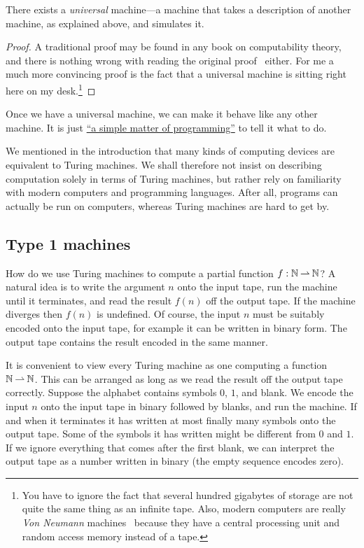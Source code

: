 \begin{theorem}[Turing]
  \label{thm:universal-machine}
  There exists a \emph{universal} machine---a machine that takes a
  description of another machine, as explained above, and simulates
  it.
\end{theorem}

\begin{proof}
  A traditional proof may be found in any book on computability
  theory, and there is nothing wrong with reading the original
  proof~\cite{turing37:_comput_number_with_applic_to_entsc} either.
  For me a much more convincing proof is the fact that a universal
  machine is sitting right here on my desk.\footnote{You have to
    ignore the fact that several hundred gigabytes of storage are not
    quite the same thing as an infinite tape. Also, modern computers
    are really \emph{Von Neumann}
    machines~\cite{goldstein47:_repor_mathem_and_logic_aspec} because
    they have a central processing unit and random access memory
    instead of a tape.}
\end{proof}

Once we have a universal machine, we can make it behave like any other
machine. It is just
\href{http://www.catb.org/jargon/html/S/SMOP.html}{``a simple matter
  of programming''} to tell it what to do.

We mentioned in the introduction that many kinds of computing devices
are equivalent to Turing machines. We shall therefore not insist on
describing computation solely in terms of Turing machines, but rather
rely on familiarity with modern computers and programming languages.
After all, programs can actually be run on computers, whereas Turing
machines are hard to get by.


\subsection{Type 1 machines}
\label{sec:type-1}

How do we use Turing machines to compute a partial function $f :
\mathbb{N} \mathbin{\rightharpoonup} \mathbb{N}$? A natural idea is to write the argument $n$ onto the
input tape, run the machine until it terminates, and read the result
$f(n)$ off the output tape. If the machine diverges then $f(n)$ is
undefined. Of course, the input $n$ must be suitably encoded onto the
input tape, for example it can be written in binary form. The output
tape contains the result encoded in the same manner.

It is convenient to view every Turing machine as one computing a
function $\mathbb{N} \mathbin{\rightharpoonup} \mathbb{N}$. This can be arranged as long as we read the
result off the output tape correctly. Suppose the alphabet contains
symbols $0$, $1$, and blank. We encode the input $n$ onto the input
tape in binary followed by blanks, and run the machine. If and when it
terminates it has written at most finally many symbols onto the output
tape. Some of the symbols it has written might be different from $0$
and $1$. If we ignore everything that comes after the first blank, we
can interpret the output tape as a number written in binary (the empty
sequence encodes zero).

